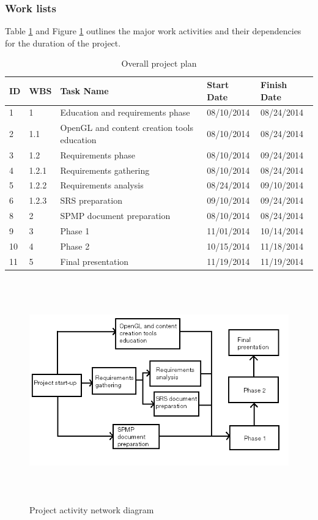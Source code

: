 \documentclass[12pt,letterpaper]{article}
\begin{document}
	\subsubsection{Work lists}
	Table \ref{tab:t3} and Figure \ref{fig:f2} outlines the major work activities and their dependencies for the duration of the project.
	
	\begin{table}[h]
		\begin{flushleft}
			\begin{tabular}{|p{0.306 in}|p{0.594 in}|p{2.758 in}|p{0.9177 in}|p{0.917 in}|}
				\hline
				ID & WBS & Task Name & Start Date & Finish Date \\\hline
				1 & 1 & Education and requirements phase & 08/10/2014 & 08/24/2014 \\\hline
				2 & 1.1 & OpenGL and content creation tools education & 08/10/2014 & 08/24/2014 \\\hline
				3 & 1.2 & Requirements phase & 08/10/2014 & 09/24/2014 \\\hline
				4 & 1.2.1 & Requirements gathering & 08/10/2014 & 08/24/2014 \\\hline
				5 & 1.2.2 & Requirements analysis & 08/24/2014 & 09/10/2014 \\\hline
				6 &
				1.2.3 & SRS preparation & 09/10/2014 & 09/24/2014 \\\hline
				8 & 2 & SPMP document preparation & 08/10/2014 & 08/24/2014 \\\hline
				9 & 3 & Phase 1 & 11/01/2014 & 10/14/2014 \\\hline
				10 & 4 & Phase 2 & 10/15/2014 & 11/18/2014 \\\hline
				11 & 5 & Final presentation & 11/19/2014 & 11/19/2014 \\\hline
			\end{tabular}
		\end{flushleft}
		\caption{Overall project plan}
		\label{tab:t3}
	\end{table}
	
	\begin{figure}[h]
		\includegraphics[width=6.5in,height=3.79in]{fig_2.png} 
		\caption{Project activity network diagram}
		\label{fig:f2}
	\end{figure}
	
\end{document}
